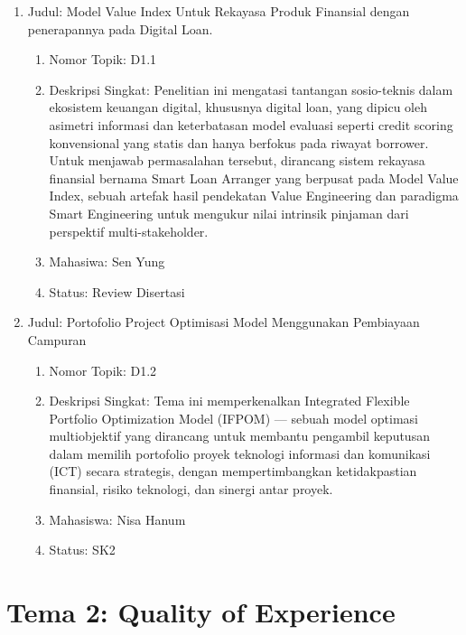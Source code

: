 \documentclass[
  letterpaper,
  DIV=11,
  numbers=noendperiod]{scrreprt}
\begin{document}
\begin{enumerate}
\def\labelenumi{\arabic{enumi}.}
\item
  Judul: Model Value Index Untuk Rekayasa Produk Finansial dengan
  penerapannya pada Digital Loan.

  \begin{enumerate}
  \def\labelenumii{\arabic{enumii}.}
  \item
    Nomor Topik: D1.1
  \item
    Deskripsi Singkat: Penelitian ini mengatasi tantangan sosio-teknis
    dalam ekosistem keuangan digital, khususnya digital loan, yang
    dipicu oleh asimetri informasi dan keterbatasan model evaluasi
    seperti credit scoring konvensional yang statis dan hanya berfokus
    pada riwayat borrower. Untuk menjawab permasalahan tersebut,
    dirancang sistem rekayasa finansial bernama Smart Loan Arranger yang
    berpusat pada Model Value Index, sebuah artefak hasil pendekatan
    Value Engineering dan paradigma Smart Engineering untuk mengukur
    nilai intrinsik pinjaman dari perspektif multi-stakeholder.
  \item
    Mahasiwa: Sen Yung
  \item
    Status: Review Disertasi
  \end{enumerate}
\item
  Judul: Portofolio Project Optimisasi Model Menggunakan Pembiayaan
  Campuran

  \begin{enumerate}
  \def\labelenumii{\arabic{enumii}.}
  \item
    Nomor Topik: D1.2
  \item
    Deskripsi Singkat: Tema ini memperkenalkan Integrated Flexible
    Portfolio Optimization Model (IFPOM) --- sebuah model optimasi
    multiobjektif yang dirancang untuk membantu pengambil keputusan
    dalam memilih portofolio proyek teknologi informasi dan komunikasi
    (ICT) secara strategis, dengan mempertimbangkan ketidakpastian
    finansial, risiko teknologi, dan sinergi antar proyek.
  \item
    Mahasiswa: Nisa Hanum
  \item
    Status: SK2
  \end{enumerate}
\end{enumerate}

\section{Tema 2: Quality of
Experience}\label{tema-2-quality-of-experience-1}
\end{document}
